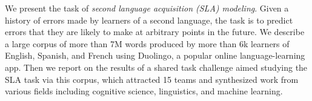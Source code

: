 We present the task of {\em second language acquisition (SLA) modeling}. Given a history of errors made by learners of a second language, the task is to predict errors that they are likely to make at arbitrary points in the future. We describe a large corpus of more than 7M words produced by more than 6k learners of English, Spanish, and French using Duolingo, a popular online language-learning app. Then we report on the results of a shared task challenge aimed studying the SLA task via this corpus, which attracted 15 teams and synthesized work from various fields including cognitive science, linguistics, and machine learning.
